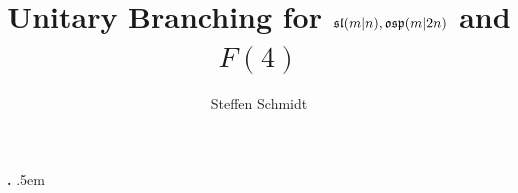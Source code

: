 \makeatletter
\newcommand{\mylabel}[2]{#2\def\@currentlabel{#2}\label{#1}}
\makeatother

\makeatletter
\newcommand{\Mac}{}
\DeclareRobustCommand{\Mac}{%
  M%
  \raisebox{\dimexpr\fontcharht\font`M-\height}{%
    \check@mathfonts\fontsize{\sf@size}{0}\selectfont
    c%
  }%
}
\makeatother



  {}%
  {}%
  {\itshape}%
  {}%
  {\bfseries}%
  {\textbf{.}}%
  {.5em}%
  {}%


\theoremstyle{plain}
\newtheorem{theorem}{Theorem}
\newtheorem{question}[theorem]{Question}
\newtheorem{lemma}[theorem]{Lemma}
\newtheorem{corollary}[theorem]{Corollary}
\newtheorem{assumption}[theorem]{Assumption}
\newtheorem{set}[theorem]{Setting}
\newtheorem{bigthm}{Theorem}
\renewcommand{\thebigthm}{\Alph{bigthm}} 

\newtheorem{proposition}[theorem]{Proposition}

\theoremstyle{remark}
\newtheorem{example}[theorem]{Example}


\theoremstyle{definition}
\newtheorem{conjecture}[theorem]{Conjecture}
\newtheorem{definition}[theorem]{Definition}

\newtheorem{hypothesis}[theorem]{Hypothesis}

\newtheorem*{problem}{Problem}

\theoremstyle{remark}
\newtheorem{remark}[theorem]{Remark}
\newtheorem*{claim}{Claim}
\newtheorem{step}[stepcounter]{Step}

{\theoremstyle{citing}
\newtheorem*{custom}{}}


{\theoremstyle{definition}
\newtheorem{Ex}[theorem]{Example}}


\title{Unitary Branching for ${\mathfrak{sl}(m\vert n)}, {\mathfrak{osp}}(m\vert 2n)$ and $F(4)$}

\author{Steffen Schmidt}
\address{Center for Quantum Mathematics, 
University of Southern Denmark, DK-5230 Odense, Denmark}





\let\origmaketitle\maketitle
\def\maketitle{
  \begingroup
  \def\uppercasenonmath##1{} %
  \let\MakeUppercase\relax %
  \origmaketitle
  \endgroup
}



